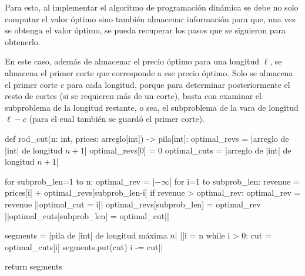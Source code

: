 Para esto, al implementar el algoritmo de programación dinámica se debe no solo computar el valor óptimo sino también almacenar información para que, una vez se obtenga el valor óptimo, se pueda recuperar los pasos que se siguieron para obtenerlo. 

En este caso, además de almacenar el precio óptimo para una longitud $\ell$, se almacena el primer corte que corresponde a ese precio óptimo. Solo se almacena el primer corte $c$ para cada longitud, porque para determinar posteriormente el resto de cortes (si se requieren más de un corte), basta con examinar el subproblema de la longitud restante, o sea, el subproblema de la vara de longitud $\ell-c$ (para el cual también se guardó el primer corte).

\begin{pseudocode}
def rod_cut(n: int, prices: arreglo[int]) -> pila[int]:
    optimal_revs = |\textrm{arreglo de }|int|\textrm{ de longitud $n+1$}|
    optimal_revs[0] = 0
    optimal_cuts = |\textrm{arreglo de }|int|\textrm{ de longitud $n+1$}|

    for subprob_len=1 to n:
        optimal_rev = |$-\infty$|
        for i=1 to subprob_len:
            revenue = prices[i] + optimal_revs[subprob_len-i]
            if revenue > optimal_rev:
                optimal_rev = revenue
                ||optimal_cut = i||
        optimal_revs[subprob_len] = optimal_rev
        ||optimal_cuts[subprob_len] = optimal_cut||

    segments = |\textrm{pila de }|int|\textrm{ de longitud máxima $n$}|
    ||i = n
    while i > 0:
        cut = optimal_cuts[i]
        segments.put(cut)
        i -= cut||

    return segments
\end{pseudocode}
\begin{annotations}
\end{annotations}











